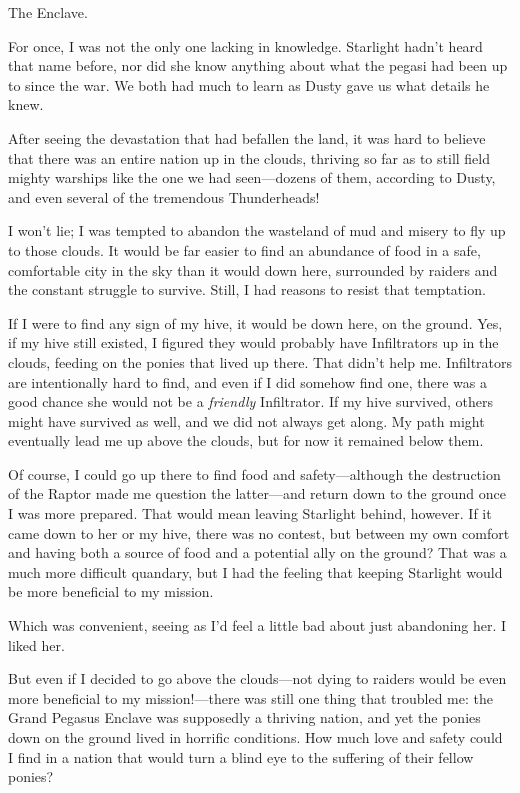The Enclave.

For once, I was not the only one lacking in knowledge. Starlight hadn’t heard that name before, nor did she know anything about what the pegasi had been up to since the war. We both had much to learn as Dusty gave us what details he knew.

After seeing the devastation that had befallen the land, it was hard to believe that there was an entire nation up in the clouds, thriving so far as to still field mighty warships like the one we had seen—dozens of them, according to Dusty, and even several of the tremendous Thunderheads!

I won’t lie; I was tempted to abandon the wasteland of mud and misery to fly up to those clouds. It would be far easier to find an abundance of food in a safe, comfortable city in the sky than it would down here, surrounded by raiders and the constant struggle to survive. Still, I had reasons to resist that temptation.

If I were to find any sign of my hive, it would be down here, on the ground. Yes, if my hive still existed, I figured they would probably have Infiltrators up in the clouds, feeding on the ponies that lived up there. That didn’t help me. Infiltrators are intentionally hard to find, and even if I did somehow find one, there was a good chance she would not be a \textit{friendly} Infiltrator. If my hive survived, others might have survived as well, and we did not always get along. My path might eventually lead me up above the clouds, but for now it remained below them.

Of course, I could go up there to find food and safety—although the destruction of the Raptor made me question the latter—and return down to the ground once I was more prepared. That would mean leaving Starlight behind, however. If it came down to her or my hive, there was no contest, but between my own comfort and having both a source of food and a potential ally on the ground? That was a much more difficult quandary, but I had the feeling that keeping Starlight would be more beneficial to my mission.

Which was convenient, seeing as I’d feel a little bad about just abandoning her. I liked her.

But even if I decided to go above the clouds—not dying to raiders would be even more beneficial to my mission!—there was still one thing that troubled me: the Grand Pegasus Enclave was supposedly a thriving nation, and yet the ponies down on the ground lived in horrific conditions. How much love and safety could I find in a nation that would turn a blind eye to the suffering of their fellow ponies?

